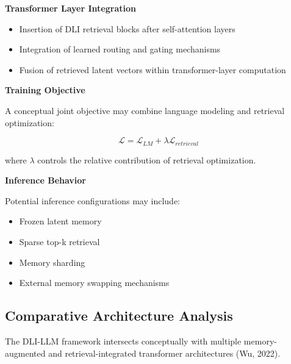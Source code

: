 \documentclass[
]{article}
\begin{document}
\textbf{Transformer Layer Integration}

\begin{itemize}
\item
  Insertion of DLI retrieval blocks after self-attention layers
\item
  Integration of learned routing and gating mechanisms
\item
  Fusion of retrieved latent vectors within transformer-layer
  computation
\end{itemize}

\textbf{Training Objective}

A conceptual joint objective may combine language modeling and retrieval
optimization:

\[\mathcal{L =}\mathcal{L}_{LM} + \lambda\mathcal{L}_{retrieval}\]

where \(\lambda\) controls the relative contribution of retrieval
optimization.

\textbf{Inference Behavior}

Potential inference configurations may include:

\begin{itemize}
\item
  Frozen latent memory
\item
  Sparse top-k retrieval
\item
  Memory sharding
\item
  External memory swapping mechanisms
\end{itemize}

\hypertarget{comparative-architecture-analysis}{%
\subsection{\texorpdfstring{ Comparative Architecture
Analysis}{ Comparative Architecture Analysis}}\label{comparative-architecture-analysis}}

The DLI-LLM framework intersects conceptually with multiple
memory-augmented and retrieval-integrated transformer architectures (Wu,
2022).
\end{document}

